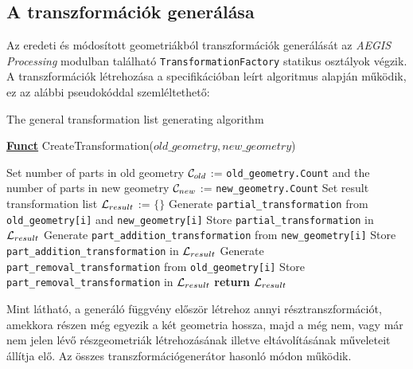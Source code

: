 \subsection{A transzformációk generálása}
Az eredeti és módosított geometriákból transzformációk generálását az \emph{AEGIS Processing} modulban található \texttt{TransformationFactory} statikus osztályok végzik.
A transzformációk létrehozása a specifikációban leírt algoritmus alapján működik, ez az alábbi pseudokóddal szemléltethető:
\begingroup
\begin{algorithm}[H]
	\caption{The general transformation list generating algorithm} 
	\label{alg:transformgen} 
	\textbf{\underline{Funct}} CreateTransformation($old\_geometry,new\_geometry$)
	\begin{algorithmic}[1] %
		\STATE Set number of parts in old geometry ${\cal C}_{old}$ := \texttt{old\_geometry.Count} and the number of parts in new geometry ${\cal C}_{new}$ :=  \texttt{new\_geometry.Count}
		\STATE Set result transformation list ${\cal L}_{result}$ := $\{\}$
			\STATE Generate \texttt{partial\_transformation} from \texttt{old\_geometry[i]} and \texttt{new\_geometry[i]}
			\STATE Store \texttt{partial\_transformation} in ${\cal L}_{result}$
		\ENDFOR
			\STATE Generate \texttt{part\_addition\_transformation} from \texttt{new\_geometry[i]}
			\STATE Store \texttt{part\_addition\_transformation} in ${\cal L}_{result}$
		\ENDFOR
		\STATE Generate \texttt{part\_removal\_transformation} from \texttt{old\_geometry[i]}
		\STATE Store \texttt{part\_removal\_transformation} in ${\cal L}_{result}$
		\ENDFOR
		\STATE \textbf{return} ${\cal L}_{result}$
	\end{algorithmic}
\end{algorithm}

\endgroup
Mint látható, a generáló függvény először létrehoz annyi résztranszformációt, amekkora részen még egyezik a két geometria hossza, majd a még nem, vagy már nem jelen lévő részgeometriák létrehozásának illetve eltávolításának műveleteit állítja elő. Az összes transzformációgenerátor hasonló módon működik.


